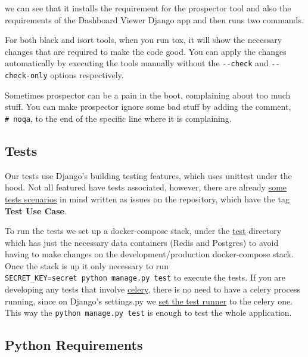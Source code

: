 \documentclass[
]{book}
\begin{document}
we can see that it installs the requirement for the prospector tool and also the requirements of the Dashboard Viewer Django app and then runs two commands.

For both black and isort tools, when you run tox, it will show the necessary changes that are required to make the code good.
You can apply the changes automatically by executing the tools manually without the \texttt{-\/-check} and \texttt{-\/-check-only} options respectively.

Sometimes prospector can be a pain in the boot, complaining about too much stuff.
You can make prospector ignore some bad stuff by adding the comment, \texttt{\#\ noqa}, to the end of the specific line where it is complaining.

\hypertarget{tests}{%
\subsection*{Tests}\label{tests}}

Our tests use Django's building testing features, which uses unittest under the hood.
Not all featured have tests associated, however, there are already \href{https://github.com/EHDEN/NetworkDashboards/issues?q=is\%3Aissue+is\%3Aopen+label\%3A\%22Test+Use+Case\%22}{some tests scenarios} in mind written as issues on the repository, which have the tag \textbf{Test Use Case}.

To run the tests we set up a docker-compose stack, under the \href{https://github.com/EHDEN/NetworkDashboards/tree/master/tests}{test} directory which has just the necessary data containers (Redis and Postgres) to avoid having to make changes on the development/production docker-compose stack.
Once the stack is up it only necessary to run \texttt{SECRET\_KEY=secret\ python\ manage.py\ test} to execute the tests.
If you are developing any tests that involve \href{https://github.com/celery/celery}{celery}, there is no need to have a celery process running, since on Django's settings.py we \href{https://github.com/EHDEN/NetworkDashboards/blob/master/dashboard_viewer/dashboard_viewer/settings.py\#L316}{set the test runner} to the celery one.
This way the \texttt{python\ manage.py\ test} is enough to test the whole application.

\hypertarget{python-requirements}{%
\subsection*{Python Requirements}\label{python-requirements}}
\end{document}
